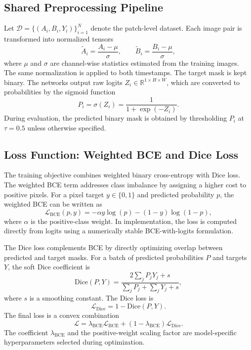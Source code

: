 \documentclass[11pt,a4paper]{article}
\begin{document}
\subsection{Shared Preprocessing Pipeline}

Let $\mathcal{D} = \{(A_i,B_i,Y_i)\}_{i=1}^{N}$ denote the patch-level dataset. Each image pair is transformed into normalized tensors
\begin{equation}
  \tilde{A}_i = \frac{A_i - \mu}{\sigma}, \qquad
  \tilde{B}_i = \frac{B_i - \mu}{\sigma},
\end{equation}
where $\mu$ and $\sigma$ are channel-wise statistics estimated from the training images. The same normalization is applied to both timestamps. The target mask is kept binary. The networks output raw logits $Z_i \in \mathbb{R}^{1 \times H \times W}$, which are converted to probabilities by the sigmoid function
\begin{equation}
  P_i = \sigma(Z_i) = \frac{1}{1+\exp(-Z_i)}.
\end{equation}
During evaluation, the predicted binary mask is obtained by thresholding $P_i$ at $\tau=0.5$ unless otherwise specified.

\subsection{Loss Function: Weighted BCE and Dice Loss}
\label{sec:loss}

The training objective combines weighted binary cross-entropy with Dice loss. The weighted BCE term addresses class imbalance by assigning a higher cost to positive pixels. For a pixel target $y \in \{0,1\}$ and predicted probability $p$, the weighted BCE can be written as
\begin{equation}
  \mathcal{L}_{\mathrm{BCE}}(p,y)
  =
  - \alpha y \log(p) - (1-y)\log(1-p),
\end{equation}
where $\alpha$ is the positive-class weight. In implementation, the loss is computed directly from logits using a numerically stable BCE-with-logits formulation.

The Dice loss complements BCE by directly optimizing overlap between predicted and target masks. For a batch of predicted probabilities $P$ and targets $Y$, the soft Dice coefficient is
\begin{equation}
  \mathrm{Dice}(P,Y)
  =
  \frac{2\sum_j P_jY_j + s}{\sum_j P_j + \sum_j Y_j + s},
\end{equation}
where $s$ is a smoothing constant. The Dice loss is
\begin{equation}
  \mathcal{L}_{\mathrm{Dice}} = 1 - \mathrm{Dice}(P,Y).
\end{equation}
The final loss is a convex combination
\begin{equation}
  \mathcal{L}
  =
  \lambda_{\mathrm{BCE}}\mathcal{L}_{\mathrm{BCE}}
  +
  (1-\lambda_{\mathrm{BCE}})\mathcal{L}_{\mathrm{Dice}}.
  \label{eq:loss}
\end{equation}
The coefficient $\lambda_{\mathrm{BCE}}$ and the positive-weight scaling factor are model-specific hyperparameters selected during optimization.
\end{document}
